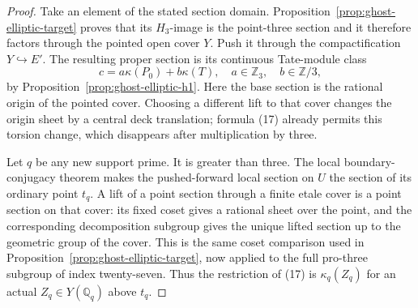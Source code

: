 \begin{proof}
Take an element of the stated section domain.
Proposition~\ref{prop:ghost-elliptic-target} proves
that its \(H_3\)-image is the point-three section
and it therefore factors through the pointed open
cover \(Y\). Push it through the compactification
\(Y\hookrightarrow E'\). The resulting proper
section is its continuous Tate-module class
\[
                 c=a\kappa(P_0)+b\kappa(T),
                   \quad a\in\mathbb Z_3,\quad
                   b\in\mathbb Z/3,
                                                        \tag{17}
\]
by Proposition~\ref{prop:ghost-elliptic-h1}.
Here the base section is the rational origin of
the pointed cover. Choosing a different lift to
that cover changes the origin sheet by a central
deck translation; formula (17) already permits
this torsion change, which disappears after
multiplication by three.

Let \(q\) be any new support prime. It is greater
than three. The local boundary-conjugacy theorem
makes the pushed-forward local section on \(U\)
the section of its ordinary point \(t_q\).
A lift of a point section through a finite etale
cover is a point section on that cover: its fixed
coset gives a rational sheet over the point, and
the corresponding decomposition subgroup gives
the unique lifted section up to the geometric
group of the cover. This is the same coset
comparison used in
Proposition~\ref{prop:ghost-elliptic-target}, now
applied to the full pro-three subgroup of index
twenty-seven. Thus the restriction of (17) is
\(\kappa_q(Z_q)\) for an actual
\(Z_q\in Y(\mathbb Q_q)\) above \(t_q\).


\end{proof}
